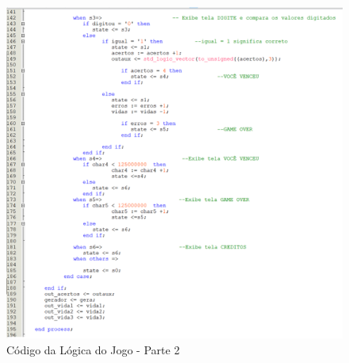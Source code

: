 \documentclass[14pt, oneside]{book}
\theoremstyle{definition}
\begin{document}
                 \begin{figure}[H]
                    \centering
                    \includegraphics[scale=0.7]{logica_jogo_parte2.png}
                    \caption{Código da Lógica do Jogo - Parte 2}
                    \label{parte2}
                \end{figure}   
                    
                    
               
               
               
                
\end{document}
